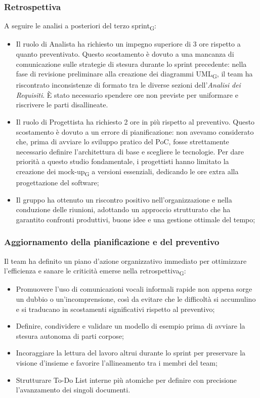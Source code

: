 ﻿\documentclass[a4paper, 10pt, colorlinks=true, linkcolor=black, urlcolor=blue, citecolor=blue, hidelinks]{article}
\begin{document}
\subsubsection{Retrospettiva}
A seguire le analisi a posteriori del terzo sprint\textsubscript{G}:
\begin{itemize}
    \item Il ruolo di Analista ha richiesto un impegno superiore di 3 ore rispetto a quanto preventivato. Questo scostamento è dovuto a una mancanza di comunicazione sulle strategie di stesura durante lo sprint precedente: nella fase di revisione preliminare alla creazione dei diagrammi UML\textsubscript{G}, il team ha riscontrato inconsistenze di formato tra le diverse sezioni dell'\textit{Analisi dei Requisiti}. È stato necessario spendere ore non previste per uniformare e riscrivere le parti disallineate.
    \item Il ruolo di Progettista ha richiesto 2 ore in più rispetto al preventivo. Questo scostamento è dovuto a un errore di pianificazione: non avevamo considerato che, prima di avviare lo sviluppo pratico del PoC, fosse strettamente necessario definire l'architettura di base e scegliere le tecnologie. Per dare priorità a questo studio fondamentale, i progettisti hanno limitato la creazione dei mock-up\textsubscript{G} a versioni essenziali, dedicando le ore extra alla progettazione del software;   
    \item Il gruppo ha ottenuto un riscontro positivo nell'organizzazione e nella conduzione delle riunioni, adottando un approccio strutturato che ha garantito confronti produttivi, buone idee e una gestione ottimale del tempo;
\end{itemize}

\subsubsection{Aggiornamento della pianificazione e del preventivo}
Il team ha definito un piano d'azione organizzativo immediato per ottimizzare l'efficienza e sanare le criticità emerse nella retrospettiva\textsubscript{G}:
\begin{itemize}
    \item Promuovere l'uso di comunicazioni vocali informali rapide non appena sorge un dubbio o un'incomprensione, così da evitare che le difficoltà si accumulino e si traducano in scostamenti significativi rispetto al preventivo;
    \item Definire, condividere e validare un modello di esempio prima di avviare la stesura autonoma di parti corpose;
    \item Incoraggiare la lettura del lavoro altrui durante lo sprint per preservare la visione d'insieme e favorire l'allineamento tra i membri del team;
    \item Strutturare To-Do List interne più atomiche per definire con precisione l'avanzamento dei singoli documenti.
\end{itemize}
\end{document}
